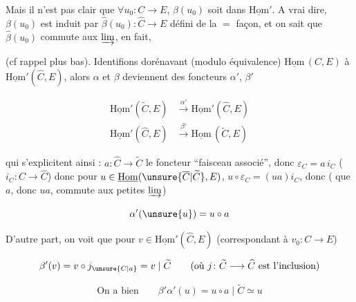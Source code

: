 Mais il n'est pas clair que $\forall u_0\colon C\longrightarrow E$, $\beta(u_0)$ soit dans $\underline{\mathrm{Hom}}'$. A vrai dire, $\beta(u_0)$ est induit par $\widehat\beta(u_0)\colon\widehat C\longrightarrow E$ défini de la $=$ façon, et on sait que $\widehat\beta(u_0)$ commute aux $\varinjlim$, en fait,


(cf rappel plus bas). Identifions dorénavant (modulo équivalence) $\underline{\mathrm{Hom}}\,(C,E)$ à $\underline{\mathrm{Hom}}'(\widehat C,E)$, alors $\alpha$ et $\beta$ deviennent des foncteurs $\alpha'$, $\beta'$

\[
\begin{aligned}
\underline{\mathrm{Hom}}'(\widetilde C,E)&\xrightarrow{\alpha'}\underline{\mathrm{Hom}}'(\widehat C,E)\\
\underline{\mathrm{Hom}}'(\widehat C,E)&\xrightarrow{\beta'}\underline{\mathrm{Hom}}\,(\widetilde C,E)
\end{aligned}
\]

qui s'explicitent ainsi :  $a\colon\widehat C\longrightarrow\widetilde C$ le foncteur ``faisceau associé'', donc $\varepsilon_C=a\,i_C$ ($i_C\colon C\longrightarrow\widehat C$) donc pour $u\in\underline{\mathrm{Hom}}(\unsure{\overline C|\widetilde C},E)$, $u\circ\varepsilon_C=(ua)i_C$, donc ( que $a$, donc $ua$, commute aux petites $\varinjlim$)

\[
\alpha'(\unsure{u})=u\circ a
\]

 D'autre part, on voit que pour $v\in\underline{\mathrm{Hom}}'(\widehat C,E)$ (correspondant à $v_0\colon C\longrightarrow E$)

\[
\beta'(v)=v\circ j_{\unsure{C|a}}=v\mid\widetilde C\qquad(\text{où }j\colon\widetilde C\longrightarrow\widehat C\text{ est l'inclusion})
\]

\[
\text{On a bien}\qquad\beta'\alpha'(u)=u\circ a\mid\widetilde C\simeq u
\]

